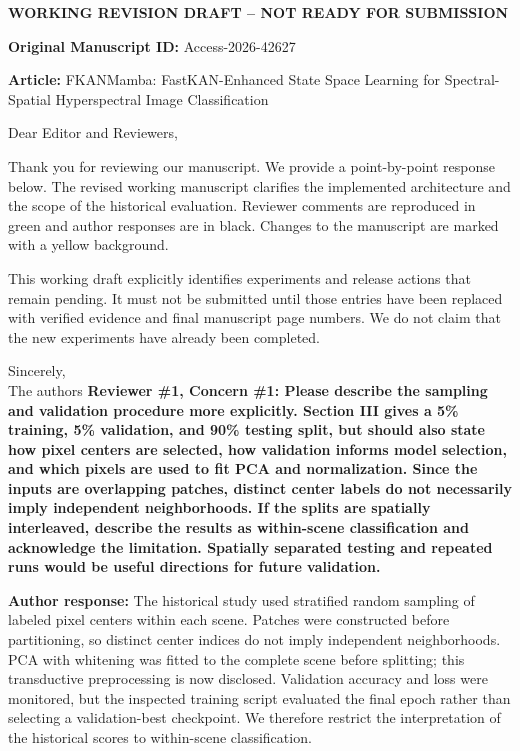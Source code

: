 \documentclass[a4paper,onecolumn,11pt]{IEEEtran}
\begin{document}
\noindent\textbf{WORKING REVISION DRAFT -- NOT READY FOR SUBMISSION}

\noindent\textbf{Original Manuscript ID:} Access-2026-42627

\noindent\textbf{Article:} FKANMamba: FastKAN-Enhanced State Space Learning for Spectral-Spatial Hyperspectral Image Classification

Dear Editor and Reviewers,

Thank you for reviewing our manuscript. We provide a point-by-point response below. The revised working manuscript clarifies the implemented architecture and the scope of the historical evaluation. Reviewer comments are reproduced in green and author responses are in black. Changes to the manuscript are marked with a yellow background.

This working draft explicitly identifies experiments and release actions that remain pending. It must not be submitted until those entries have been replaced with verified evidence and final manuscript page numbers. We do not claim that the new experiments have already been completed.

Sincerely,\\
The authors
\newpage
{\color{reviewgreen}\textbf{Reviewer \#1, Concern \#1: Please describe the sampling and validation procedure more explicitly. Section III gives a 5\% training, 5\% validation, and 90\% testing split, but should also state how pixel centers are selected, how validation informs model selection, and which pixels are used to fit PCA and normalization. Since the inputs are overlapping patches, distinct center labels do not necessarily imply independent neighborhoods. If the splits are spatially interleaved, describe the results as within-scene classification and acknowledge the limitation. Spatially separated testing and repeated runs would be useful directions for future validation. }}

\textbf{Author response:}
The historical study used stratified random sampling of labeled pixel centers within each scene. Patches were constructed before partitioning, so distinct center indices do not imply independent neighborhoods. PCA with whitening was fitted to the complete scene before splitting; this transductive preprocessing is now disclosed. Validation accuracy and loss were monitored, but the inspected training script evaluated the final epoch rather than selecting a validation-best checkpoint. We therefore restrict the interpretation of the historical scores to within-scene classification.
\end{document}
